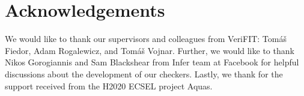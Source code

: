 \documentclass{ExcelAtFIT}
\begin{document}

\section*{Acknowledgements}
We would like to thank our supervisors and
colleagues from VeriFIT: Tomáš Fiedor,
Adam Rogalewicz, and Tomáš Vojnar. Further, we
would like to thank Nikos Gorogiannis and Sam Blackshear
from Infer team at Facebook for helpful discussions
about the development of our checkers. Lastly, we thank
for the support received from the H2020 ECSEL project Aquas.




\end{document}
